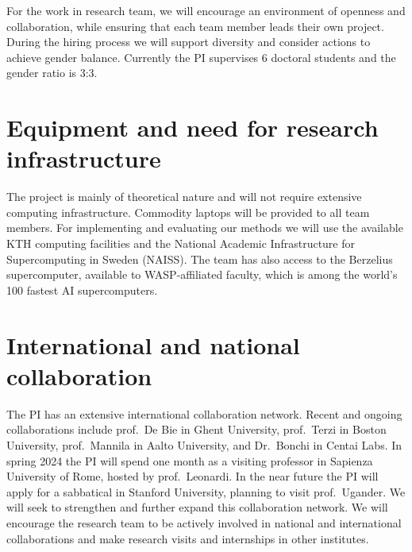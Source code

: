 \documentclass[a4paper,11pt]{article}
\begin{document}
For the work in research team, 
we will encourage an environment of openness and collaboration, 
while ensuring that each team member leads their own project.
%
During the hiring process we will support diversity and consider actions to achieve gender balance. 
Currently the PI supervises 6 doctoral students and the gender ratio is 3:3.




\section{Equipment and need for research infrastructure}


The project is mainly of theoretical nature and will not require extensive computing infrastructure. 
Commodity laptops will be provided to all team members. 
For implementing and evaluating our methods we will use the available 
KTH computing facilities
and the National Academic Infrastructure for Supercomputing in Sweden (NAISS).
The team has also access to the Berzelius supercomputer, 
available to WASP-affiliated faculty, 
which is among the world's 100 fastest AI supercomputers.

\section{International and national collaboration}


The PI has an extensive international collaboration network. 
Recent and ongoing collaborations include
prof.\ De Bie in Ghent University, 
prof.\ Terzi in Boston University,
prof.\ Mannila in Aalto University, and 
Dr.\ Bonchi in Centai Labs.
In spring 2024 the PI will spend one month as a visiting professor 
in Sapienza University of Rome, hosted by prof.\ Leonardi.
In the near future the PI will apply for a sabbatical in Stanford University, 
planning to visit prof.\ Ugander. 
We will seek to strengthen and further expand this collaboration network.
We will encourage the research team to be actively involved in national and international collaborations
and make research visits and internships in other institutes.
\end{document}
